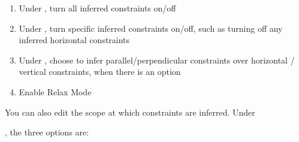 \begin{enumerate}
    \item Under , turn all inferred constraints on/off
    \item Under , turn specific inferred constraints on/off, such as turning off any inferred horizontal constraints
    \item Under , choose to infer parallel/perpendicular constraints over horizontal / vertical constraints, when there is an option
    \item Enable Relax Mode
\end{enumerate}

You can also edit the scope at which constraints are inferred. Under 

, the three options are:

